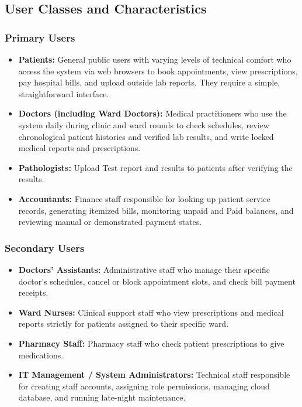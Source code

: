 \documentclass[11pt,a4paper]{article}
\begin{document}
\subsection{User Classes and Characteristics}

\subsubsection{Primary Users}
\begin{itemize}
    \item \textbf{Patients:} General public users with varying levels of technical comfort who access the system via web browsers to book appointments, view prescriptions, pay hospital bills, and upload outside lab reports. They require a simple, straightforward interface.

    \item \textbf{Doctors (including Ward Doctors):} Medical practitioners who use the system daily during clinic and ward rounds to check schedules, review chronological patient histories and verified lab results, and write locked medical reports and prescriptions.

    \item \textbf{Pathologists:} Upload Test report and results to patients after verifying the results.

    \item \textbf{Accountants:} Finance staff responsible for looking up patient service records, generating itemized bills, monitoring unpaid and Paid balances, and reviewing manual or demonstrated payment states.
\end{itemize}

\subsubsection{Secondary Users}
\begin{itemize}
    \item \textbf{Doctors' Assistants:} Administrative staff who manage their specific doctor's schedules, cancel or block appointment slots, and check bill payment receipts.

    \item \textbf{Ward Nurses:} Clinical support staff who view prescriptions and medical reports strictly for patients assigned to their specific ward.

    \item \textbf{Pharmacy Staff:} Pharmacy staff who check patient prescriptions to give medications.

    \item \textbf{IT Management / System Administrators:} Technical staff responsible for creating staff accounts, assigning role permissions, managing cloud database, and running late-night maintenance.
\end{itemize}
\end{document}
